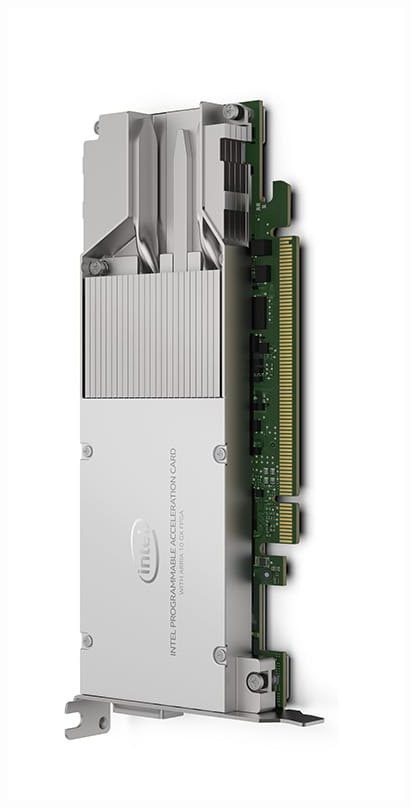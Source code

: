 \begin{frame}
\begin{columns}
\begin{column}{0.2\textwidth}
\includegraphics[scale=0.2]{./background/intel_fpga_nic.jpg}
\end{column}
\end{columns}

\end{frame}


